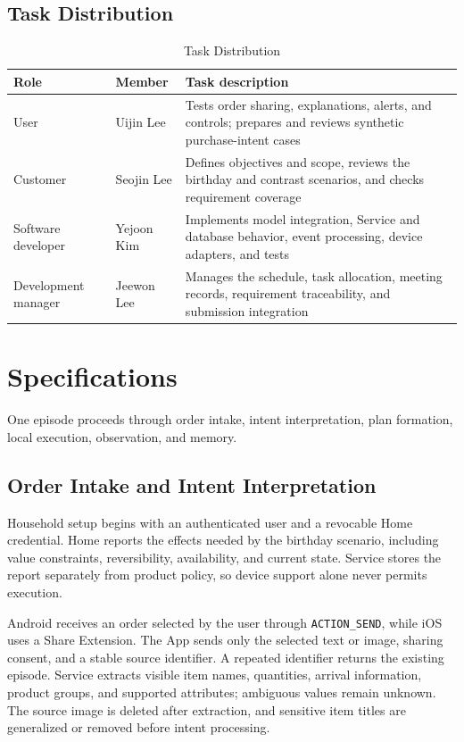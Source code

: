 \documentclass[conference]{IEEEtran}
\begin{document}
\subsection{Task Distribution}
\begin{table}[H]
\caption{Task Distribution}
\centering
\footnotesize
\setlength{\tabcolsep}{2.5pt}
\renewcommand{\arraystretch}{1.08}
\begin{tabularx}{\columnwidth}{@{}>{\raggedright\arraybackslash}p{}>{\raggedright\arraybackslash}p{}>{\raggedright\arraybackslash}X@{}}
\toprule
\textbf{Role} & \textbf{Member} & \textbf{Task description} \\
\midrule
User & Uijin Lee & Tests order sharing, explanations, alerts, and controls; prepares and reviews synthetic purchase-intent cases \\
Customer & Seojin Lee & Defines objectives and scope, reviews the birthday and contrast scenarios, and checks requirement coverage \\
Software developer & Yejoon Kim & Implements model integration, Service and database behavior, event processing, device adapters, and tests \\
Development manager & Jeewon Lee & Manages the schedule, task allocation, meeting records, requirement traceability, and submission integration \\
\bottomrule
\end{tabularx}
\label{tab:auto-1}
\end{table}
\section{Specifications}
One episode proceeds through order intake, intent interpretation, plan formation, local execution, observation, and memory.

\subsection{Order Intake and Intent Interpretation}
Household setup begins with an authenticated user and a revocable Home credential. Home reports the effects needed by the birthday scenario, including value constraints, reversibility, availability, and current state. Service stores the report separately from product policy, so device support alone never permits execution.

Android receives an order selected by the user through \texttt{ACTION\_SEND}, while iOS uses a Share Extension. The App sends only the selected text or image, sharing consent, and a stable source identifier. A repeated identifier returns the existing episode. Service extracts visible item names, quantities, arrival information, product groups, and supported attributes; ambiguous values remain unknown. The source image is deleted after extraction, and sensitive item titles are generalized or removed before intent processing.
\end{document}
